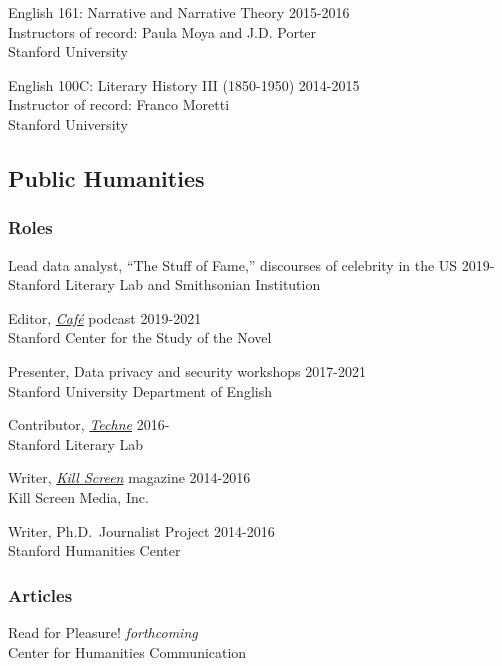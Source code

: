 \documentclass[
  12pt,
  letterpaper,
]{article}
\begin{document}
English 161: Narrative and Narrative Theory \hfill 2015-2016\\
Instructors of record: Paula Moya and J.D. Porter\\
Stanford University

English 100C: Literary History III (1850-1950) \hfill 2014-2015\\
Instructor of record: Franco Moretti\\
Stanford University

\hypertarget{public-humanities}{%
\subsection{Public Humanities}\label{public-humanities}}

\hypertarget{roles}{%
\subsubsection{Roles}\label{roles}}

Lead data analyst, ``The Stuff of Fame,'' discourses of celebrity in the
US \hfill 2019-\\
Stanford Literary Lab and Smithsonian Institution

Editor, \href{https://novel.stanford.edu/csn-cafe}{\emph{Café}} podcast
\hfill 2019-2021\\
Stanford Center for the Study of the Novel

Presenter, Data privacy and security workshops \hfill 2017-2021\\
Stanford University Department of English

Contributor, \href{https://litlab.stanford.edu/techne/}{\emph{Techne}}
\hfill 2016-\\
Stanford Literary Lab

Writer, \href{https://web.archive.org/web/20221003115514/https://killscreen.com/previously/author/erik-fredner/}{\emph{Kill Screen}} magazine \hfill 2014-2016\\
Kill Screen Media, Inc.

Writer, Ph.D.~Journalist Project \hfill 2014-2016\\
Stanford Humanities Center

\hypertarget{articles}{%
\subsubsection{Articles}\label{articles}}

Read for Pleasure! \hfill \emph{forthcoming}\\
Center for Humanities Communication
\end{document}
